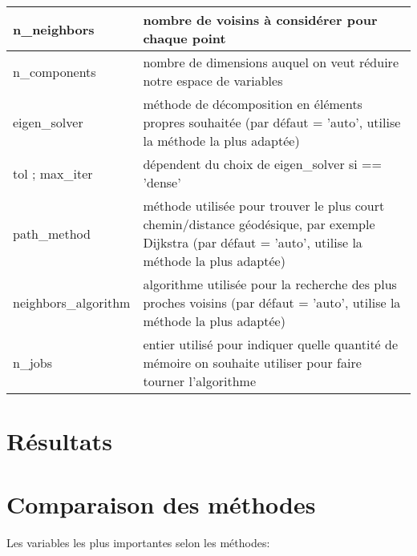 \documentclass[12pt]{article}
\begin{document}
\begin{table}[!h]
\begin{tabular}{@{}|l|l|@{}}
\toprule
n\_neighbors         & nombre de voisins à considérer pour chaque point                                                                                                       \\ \midrule
n\_components        & nombre de dimensions auquel on veut réduire notre espace de variables                                                                                  \\ \midrule
eigen\_solver        & méthode de décomposition en éléments propres souhaitée (par défaut = 'auto',  utilise la méthode la plus adaptée)                                      \\ \midrule
tol ; max\_iter      & dépendent du choix de eigen\_solver si == 'dense'                                                                                                      \\ \midrule
path\_method         & méthode utilisée pour trouver le plus court chemin/distance géodésique, par exemple Dijkstra (par défaut = 'auto', utilise la méthode la plus adaptée) \\ \midrule
neighbors\_algorithm & algorithme utilisée pour la recherche des plus proches voisins (par défaut = 'auto', utilise la méthode la plus adaptée)                               \\ \midrule
n\_jobs              & entier utilisé pour indiquer quelle quantité de mémoire on souhaite utiliser pour faire tourner l'algorithme                                           \\ \bottomrule
\end{tabular}
\end{table}


\newpage
\part{Résultats}

\newpage
\part{Comparaison des méthodes}

Les variables les plus importantes selon les méthodes:
\end{document}
